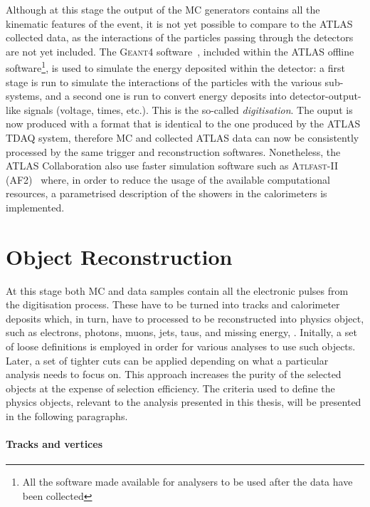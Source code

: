 			Although at this stage the output of the \ac{MC} generators contains all the kinematic features of the event, it is not yet possible to compare to the \ac{ATLAS} collected data, as the interactions of the particles passing through the detectors are not yet included. The \textsc{Geant4} software~\cite{Geant42003}, included within the \ac{ATLAS} offline software\footnote{All the software made available for analysers to be used after the data have been collected}, is used to simulate the energy deposited within the detector: a first stage is run to simulate the interactions of the particles with the various sub-systems, and a second one is run to convert energy deposits into detector-output-like signals (voltage, times, etc.). This is the so-called \emph{digitisation}. The ouput is now produced with a format that is identical to the one produced by the \ac{ATLAS} \ac{TDAQ} system, therefore \ac{MC} and collected \ac{ATLAS} data can now be consistently processed by the same trigger and reconstruction softwares. Nonetheless, the \ac{ATLAS} Collaboration also use faster simulation software such as \textsc{Atlfast-II} (AF2)~\cite{Lukas2012} where, in order to reduce the usage of the available computational resources, a parametrised description of the showers in the calorimeters is implemented. 


	\section{Object Reconstruction}
	\label{sec:objReco}

		At this stage both \ac{MC} and data samples contain all the electronic pulses from the digitisation process. These have to be turned into tracks and calorimeter deposits which, in turn, have to processed to be reconstructed into physics object, such as electrons, photons, muons, jets, taus, and missing energy, \met. Initally, a set of loose definitions is employed in order for various analyses to use such objects. Later, a set of tighter cuts can be applied depending on what a particular analysis needs to focus on. This approach increases the purity of the selected objects at the expense of selection efficiency. The criteria used to define the physics objects, relevant to the analysis presented in this thesis, will be presented in the following paragraphs.


		\paragraph*{Tracks and vertices}


